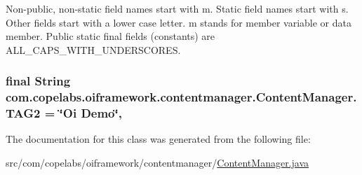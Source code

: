 Non-\/public, non-\/static field names start with m. Static field names start with s. Other fields start with a lower case letter. m stands for member variable or data member. Public static final fields (constants) are A\+L\+L\+\_\+\+C\+A\+P\+S\+\_\+\+W\+I\+T\+H\+\_\+\+U\+N\+D\+E\+R\+S\+C\+O\+R\+E\+S. \hypertarget{classcom_1_1copelabs_1_1oiframework_1_1contentmanager_1_1_content_manager_a54253c268f02b62bf5db606859ab7b5b}{}
\subsubsection[{T\+A\+G2}]{\setlength{\rightskip}{0pt plus 5cm}final String com.\+copelabs.\+oiframework.\+contentmanager.\+Content\+Manager.\+T\+A\+G2 = \char`\"{}Oi Demo\char`\"{}\hspace{0.3cm}{\ttfamily [static]}, {\ttfamily [private]}}\label{classcom_1_1copelabs_1_1oiframework_1_1contentmanager_1_1_content_manager_a54253c268f02b62bf5db606859ab7b5b}


The documentation for this class was generated from the following file\+:\begin{DoxyCompactItemize}
\item 
src/com/copelabs/oiframework/contentmanager/\hyperlink{_content_manager_8java}{Content\+Manager.\+java}\end{DoxyCompactItemize}
